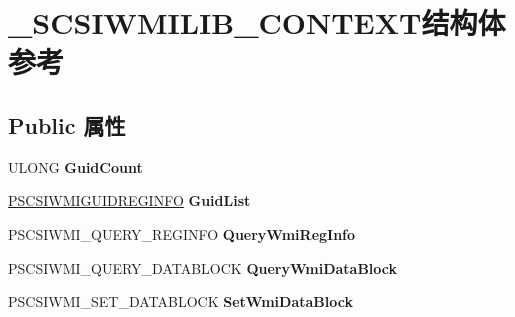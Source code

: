 \hypertarget{struct___s_c_s_i_w_m_i_l_i_b___c_o_n_t_e_x_t}{}\section{\+\_\+\+S\+C\+S\+I\+W\+M\+I\+L\+I\+B\+\_\+\+C\+O\+N\+T\+E\+X\+T结构体 参考}
\label{struct___s_c_s_i_w_m_i_l_i_b___c_o_n_t_e_x_t}
\subsection*{Public 属性}
\begin{DoxyCompactItemize}
\item 
\mbox{\label{struct___s_c_s_i_w_m_i_l_i_b___c_o_n_t_e_x_t_a471f6b53084f0cb7db3fca1591e32649}} 
U\+L\+O\+NG {\bfseries Guid\+Count}
\item 
\mbox{\label{struct___s_c_s_i_w_m_i_l_i_b___c_o_n_t_e_x_t_af909c00d4a95eaed5e77a269280fb5f9}} 
\hyperlink{struct___s_c_s_i_w_m_i_g_u_i_d_r_e_g_i_n_f_o}{P\+S\+C\+S\+I\+W\+M\+I\+G\+U\+I\+D\+R\+E\+G\+I\+N\+FO} {\bfseries Guid\+List}
\item 
\mbox{\label{struct___s_c_s_i_w_m_i_l_i_b___c_o_n_t_e_x_t_a76e49dae1394945232f28776c9ca39f0}} 
P\+S\+C\+S\+I\+W\+M\+I\+\_\+\+Q\+U\+E\+R\+Y\+\_\+\+R\+E\+G\+I\+N\+FO {\bfseries Query\+Wmi\+Reg\+Info}
\item 
\mbox{\label{struct___s_c_s_i_w_m_i_l_i_b___c_o_n_t_e_x_t_a5bcd648cca9be254c3ad0b51e3e8e3ee}} 
P\+S\+C\+S\+I\+W\+M\+I\+\_\+\+Q\+U\+E\+R\+Y\+\_\+\+D\+A\+T\+A\+B\+L\+O\+CK {\bfseries Query\+Wmi\+Data\+Block}
\item 
\mbox{\label{struct___s_c_s_i_w_m_i_l_i_b___c_o_n_t_e_x_t_a2889eab2ecdfd3e86668a069788f2bc1}} 
P\+S\+C\+S\+I\+W\+M\+I\+\_\+\+S\+E\+T\+\_\+\+D\+A\+T\+A\+B\+L\+O\+CK {\bfseries Set\+Wmi\+Data\+Block}
\item 
\mbox{\label{struct___s_c_s_i_w_m_i_l_i_b___c_o_n_t_e_x_t_a44ae1053013d847aa5decc155a670a00}} 

\end{DoxyCompactItemize}
